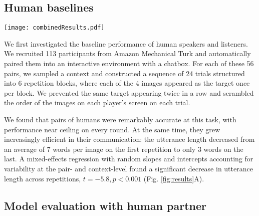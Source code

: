 \subsection{Human baselines}


\begin{figure*}[t]
\centering
\texttt{[image: combinedResults.pdf]}
\caption{(A) Human speakers grow more efficient and accurate as our model adapts. Curves show regression fits. (B) Speaker KL regularization prevents catastrophic forgetting. Error bars and ribbons are bootstrapped 95\% CIs.}
\vspace{-1em}
\label{fig:results}
\end{figure*}

We first investigated the baseline performance of human speakers and listeners. %
We recruited 113 participants from Amazon Mechanical Turk and automatically paired them into an interactive environment with a chatbox.
For each of these 56 pairs, we sampled a context and constructed a sequence of 24 trials structured into 6 repetition blocks, where each of the 4 images appeared as the target once per block. 
We prevented the same target appearing twice in a row and scrambled the order of the images on each player's screen on each trial. 

We found that pairs of humans were remarkably accurate at this task, with performance near ceiling on every round.
At the same time, they grew increasingly efficient in their communication: the utterance length decreased from an average of 7 words per image on the first repetition to only 3 words on the last.
A mixed-effects regression with random slopes and intercepts accounting for variability at the pair- and context-level found a significant decrease in utterance length across repetitions, $t=-5.8, p < 0.001$ (Fig. \ref{fig:results}A).

\subsection{Model evaluation with human partner}

